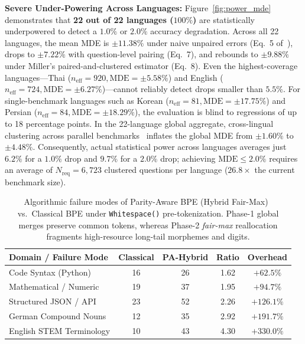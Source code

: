 \textbf{Severe Under-Powering Across Languages:} Figure~\ref{fig:power_mde} demonstrates that \textbf{22 out of 22 languages ($100\%$)} are statistically underpowered to detect a $1.0\%$ or $2.0\%$ accuracy degradation. Across all 22 languages, the mean MDE is $\pm 11.38\%$ under naive unpaired errors (Eq.~5 of~\cite{miller2024adding}), drops to $\pm 7.22\%$ with question-level pairing (Eq.~7), and rebounds to $\mathbf{\pm 9.88\%}$ under Miller's paired-and-clustered estimator (Eq.~8). Even the highest-coverage languages---Thai ($n_{\mathrm{eff}} = 920, \mathrm{MDE} = \pm 5.58\%$) and English ($n_{\mathrm{eff}} = 724, \mathrm{MDE} = \pm 6.27\%$)---cannot reliably detect drops smaller than $5.5\%$. For single-benchmark languages such as Korean ($n_{\mathrm{eff}} = 81, \mathrm{MDE} = \pm 17.75\%$) and Persian ($n_{\mathrm{eff}} = 84, \mathrm{MDE} = \pm 18.29\%$), the evaluation is blind to regressions of up to 18 percentage points. In the 22-language global aggregate, cross-lingual clustering across parallel benchmarks~\cite{nllb2022no} inflates the global MDE from $\pm 1.60\%$ to $\mathbf{\pm 4.48\%}$. Consequently, actual statistical power across languages averages just $6.2\%$ for a $1.0\%$ drop and $9.7\%$ for a $2.0\%$ drop; achieving $\mathrm{MDE} \le 2.0\%$ requires an average of $N_{\mathrm{req}}=6{,}723$ clustered questions per language ($26.8\times$ the current benchmark size).

\begin{table}[t]
\centering
\caption{Algorithmic failure modes of Parity-Aware BPE (Hybrid Fair-Max)~\cite{foroutan2026parity} vs.\ Classical BPE under \texttt{Whitespace()} pre-tokenization. Phase-1 global merges preserve common tokens, whereas Phase-2 \textit{fair-max} reallocation fragments high-resource long-tail morphemes and digits.}
\vspace{-0.6em}
\footnotesize
\setlength{\tabcolsep}{2.8pt}
\begin{tabular}{lcccc}
\toprule
\textbf{Domain / Failure Mode} & \textbf{Classical} & \textbf{PA-Hybrid} & \textbf{Ratio} & \textbf{Overhead} \\
\midrule
Code Syntax (Python)       & 16 & 26 & 1.62 & $+62.5\%$  \\
Mathematical / Numeric     & 19 & 37 & 1.95 & $+94.7\%$  \\
Structured JSON / API      & 23 & 52 & 2.26 & $+126.1\%$ \\
German Compound Nouns      & 12 & 35 & 2.92 & $+191.7\%$ \\
English STEM Terminology   & 10 & 43 & 4.30 & $+330.0\%$ \\
\bottomrule
\end{tabular}
\vspace{-0.8em}
\label{tab:failure_modes}
\end{table}

